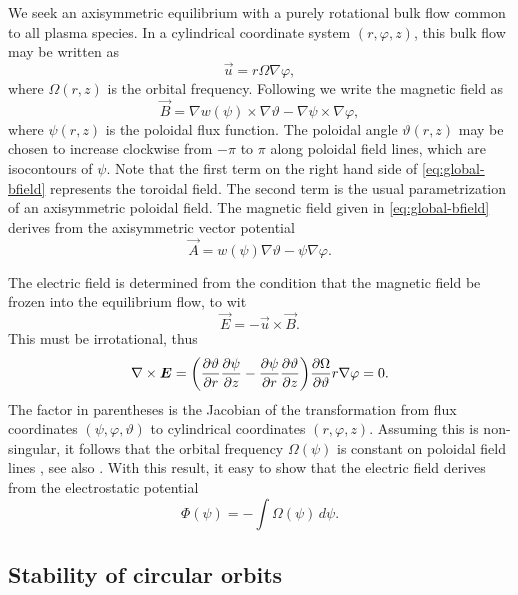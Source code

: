\documentclass[aps,pre,notitlepage,amsmath,amssymb,amsfonts,nobibnotes,nofootinbib,superscriptaddress]{revtex4-1}
\begin{document}
We seek an axisymmetric equilibrium with a purely rotational bulk flow common
to all plasma species. In a cylindrical coordinate system $(r,\varphi,z)$,
this bulk flow may be written as
\begin{equation}
  \vec{u} = r\Omega\nabla\varphi,
\end{equation}
where $\Omega(r,z)$ is the orbital frequency. Following
\citet{Kaufman1972,Cary1983} we write the magnetic field as
\begin{equation}
  \label{eq:global-bfield}
  \vec{B} =
  \nabla w(\psi)\times\nabla\vartheta - \nabla\psi\times\nabla\varphi,
\end{equation}
where $\psi(r,z)$ is the poloidal flux function. The poloidal angle
$\vartheta(r,z)$ may be chosen to increase clockwise from $-\pi$ to $\pi$
along poloidal field lines, which are isocontours of $\psi$. Note that the
first term on the right hand side of \cref{eq:global-bfield} represents the
toroidal field. The second term is the usual parametrization of an
axisymmetric poloidal field. The magnetic field given in
\cref{eq:global-bfield} derives from the axisymmetric vector potential
\begin{equation}
  \vec{A} = w(\psi)\nabla\vartheta - \psi\nabla\varphi.
\end{equation}

The electric field is determined from the condition that the magnetic field be
frozen into the equilibrium flow, to wit
\begin{equation}
  \vec{E} = -\vec{u}\times\vec{B}.
\end{equation}
This must be irrotational, thus
\begin{equation}
  \nabla\times\vec{E} =
  \left(
    \pder{\vartheta}{r}\pder{\psi}{z} -
    \pder{\psi}{r}\pder{\vartheta}{z}
  \right)
  \pder{\Omega}{\vartheta}r\nabla\varphi = 0.
\end{equation}
The factor in parentheses is the Jacobian of the transformation from flux
coordinates $(\psi,\varphi,\vartheta)$ to cylindrical coordinates
$(r,\varphi,z)$. Assuming this is non-singular, it follows that the orbital
frequency $\Omega(\psi)$ is constant on poloidal field lines
\citep{Ferraro1937}, see also \citet{Papaloizou1992}. With this result, it
easy to show that the electric field derives from the electrostatic potential
\begin{equation}
  \Phi(\psi) = -\int\!\Omega(\psi)\,d\psi.
\end{equation}

\subsection{Stability of circular orbits}
\end{document}
